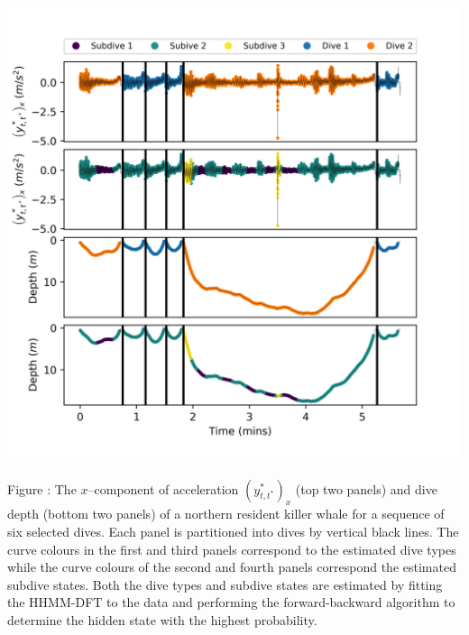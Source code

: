 \documentclass{article}
\begin{document}
        \begin{center}
        \includegraphics[width=6in]{../Plots/HHMM_decoded_dives.png}
        \end{center}
        
        \noindent Figure : The $x$--component of acceleration $\left(y^*_{t,t^*}\right)_x$ (top two panels) and dive depth (bottom two panels) of a northern resident killer whale for a sequence of six selected dives. Each panel is partitioned into dives by vertical black lines. The curve colours in the first and third panels correspond to the estimated dive types while the curve colours of the second and fourth panels correspond the estimated subdive states. Both the dive types and subdive states are estimated by fitting the HHMM-DFT to the data and performing the forward-backward algorithm to determine the hidden state with the highest probability.
        \addtocounter{fignum}{1}
        
\end{document}
